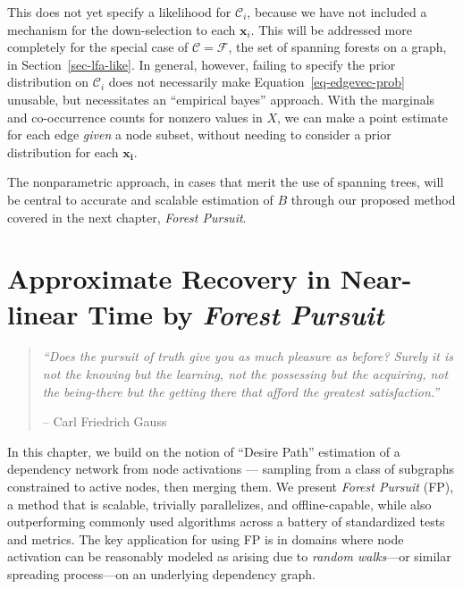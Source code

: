 \documentclass[%
	12pt,
		oneside,
		letterpaper
]{book}
\begin{document}
This does not yet specify a likelihood for \(\mathcal{C}_i\), because we have not included a mechanism for the down-selection to each \(\mathbf{x}_i\).
This will be addressed more completely for the special case of \(\mathcal{C}=\mathcal{F}\), the set of spanning forests on a graph, in Section~\ref{sec-lfa-like}.
In general, however, failing to specify the prior distribution on \(\mathcal{C}_i\) does not necessarily make Equation~\ref{eq-edgevec-prob} unusable, but necessitates an ``empirical bayes'' approach.
With the marginals and co-occurrence counts for nonzero values in \(X\), we can make a point estimate for each edge \emph{given} a node subset, without needing to consider a prior distribution for each \(\mathbf{x_i}\).

The nonparametric approach, in cases that merit the use of spanning trees, will be central to accurate and scalable estimation of \(B\) through our proposed method covered in the next chapter, \emph{Forest Pursuit}.

\chapter{\texorpdfstring{Approximate Recovery in Near-linear Time by \emph{Forest Pursuit}}{Approximate Recovery in Near-linear Time by Forest Pursuit}}\label{sec-fp}

\begin{flushright}

\begin{minipage}{.7\linewidth}

\singlespacing

\begin{quote}
\emph{``Does the pursuit of truth give you as much pleasure as before? Surely it is not the knowing but the learning, not the possessing but the acquiring, not the being-there but the getting there that afford the greatest satisfaction.''}

\hfill -- Carl Friedrich Gauss\\
\doublespacing
\end{quote}

\end{minipage}

\end{flushright}

In this chapter, we build on the notion of ``Desire Path'' estimation of a dependency network from node activations --- sampling from a class of subgraphs constrained to active nodes, then merging them.
We present \emph{Forest Pursuit} (FP), a method that is scalable, trivially parallelizes, and offline-capable, while also outperforming commonly used algorithms across a battery of standardized tests and metrics.
The key application for using FP is in domains where node activation can be reasonably modeled as arising due to \emph{random walks}---or similar spreading process---on an underlying dependency graph.
\end{document}
